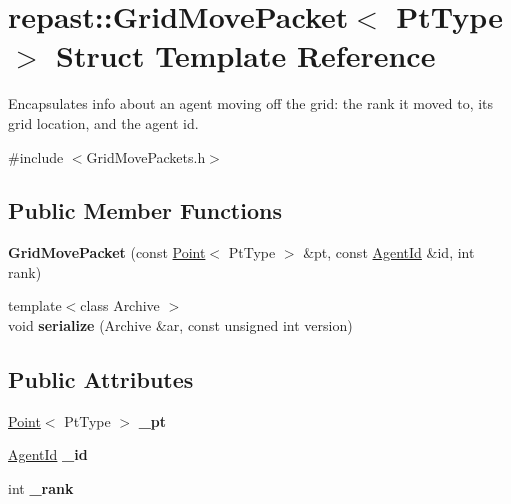 \hypertarget{structrepast_1_1_grid_move_packet}{\section{repast\-:\-:Grid\-Move\-Packet$<$ Pt\-Type $>$ Struct Template Reference}
\label{structrepast_1_1_grid_move_packet}
}


Encapsulates info about an agent moving off the grid\-: the rank it moved to, its grid location, and the agent id.  




{\ttfamily \#include $<$Grid\-Move\-Packets.\-h$>$}

\subsection*{Public Member Functions}
\begin{DoxyCompactItemize}
\item 
\hypertarget{structrepast_1_1_grid_move_packet_a72a97c5b7298dc21c12ed462f34f3abf}{{\bfseries Grid\-Move\-Packet} (const \hyperlink{classrepast_1_1_point}{Point}$<$ Pt\-Type $>$ \&pt, const \hyperlink{classrepast_1_1_agent_id}{Agent\-Id} \&id, int rank)}\label{structrepast_1_1_grid_move_packet_a72a97c5b7298dc21c12ed462f34f3abf}

\item 
\hypertarget{structrepast_1_1_grid_move_packet_a616996fc4caa27fc8b39042d57949d82}{{\footnotesize template$<$class Archive $>$ }\\void {\bfseries serialize} (Archive \&ar, const unsigned int version)}\label{structrepast_1_1_grid_move_packet_a616996fc4caa27fc8b39042d57949d82}

\end{DoxyCompactItemize}
\subsection*{Public Attributes}
\begin{DoxyCompactItemize}
\item 
\hypertarget{structrepast_1_1_grid_move_packet_aa6c737c40abca83df760661a558ba8b3}{\hyperlink{classrepast_1_1_point}{Point}$<$ Pt\-Type $>$ {\bfseries \-\_\-pt}}\label{structrepast_1_1_grid_move_packet_aa6c737c40abca83df760661a558ba8b3}

\item 
\hypertarget{structrepast_1_1_grid_move_packet_ace518a4ce7056ce51a108731273e2807}{\hyperlink{classrepast_1_1_agent_id}{Agent\-Id} {\bfseries \-\_\-id}}\label{structrepast_1_1_grid_move_packet_ace518a4ce7056ce51a108731273e2807}

\item 
\hypertarget{structrepast_1_1_grid_move_packet_ac6b40e29aef48809fb684a88036e61cb}{int {\bfseries \-\_\-rank}}\label{structrepast_1_1_grid_move_packet_ac6b40e29aef48809fb684a88036e61cb}

\end{DoxyCompactItemize}



